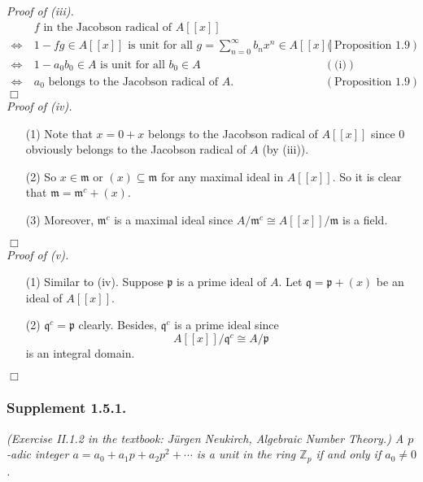 \documentclass{article}
\begin{document}
\emph{Proof of (iii).}
  \begin{align*}
    &\:
    \text{$f$ in the Jacobson radical of $A[[x]]$} \\
    \Longleftrightarrow &\:
    \text{$1-fg \in A[[x]]$ is unit for all $g = \sum_{n=0}^{\infty} b_n x^n \in A[[x]]$}
      &(\text{Proposition 1.9}) \\
    \Longleftrightarrow &\:
    \text{$1-a_0b_0 \in A$ is unit for all $b_0 \in A$}
      &(\text{(i)}) \\
    \Longleftrightarrow &\:
    \text{$a_0$ belongs to the Jacobson radical of $A$}.
      &(\text{Proposition 1.9})
  \end{align*}
$\Box$ \\



\emph{Proof of (iv).}
\begin{enumerate}
\item[(1)]
  Note that $x = 0 + x$ belongs to the Jacobson radical of $A[[x]]$ since
  $0$ obviously belongs to the Jacobson radical of $A$ (by (iii)).

\item[(2)]
  So $x \in \mathfrak{m}$ or $(x) \subseteq \mathfrak{m}$ for any maximal ideal in $A[[x]]$.
  So it is clear that $\mathfrak{m} = \mathfrak{m}^c + (x)$.

\item[(3)]
  Moreover, $\mathfrak{m}^c$ is a maximal ideal since
  $A/\mathfrak{m}^c \cong A[[x]]/\mathfrak{m}$ is a field.
\end{enumerate}
$\Box$ \\



\emph{Proof of (v).}
\begin{enumerate}
\item[(1)]
  Similar to (iv).
  Suppose $\mathfrak{p}$ is a prime ideal of $A$.
  Let $\mathfrak{q} = \mathfrak{p} + (x)$ be an ideal of $A[[x]]$.

\item[(2)]
  $\mathfrak{q}^c = \mathfrak{p}$ clearly.
  Besides, $\mathfrak{q}^c$ is a prime ideal since
  \[
    A[[x]]/\mathfrak{q}^c \cong A/\mathfrak{p}
  \]
  is an integral domain.
\end{enumerate}
$\Box$ \\



\subsubsection*{Supplement 1.5.1.}
\emph{(Exercise II.1.2 in the textbook: Jürgen Neukirch, Algebraic Number Theory.)
A $p$-adic integer $a = a_0 + a_1 p + a_2 p^2 + \cdots$
is a unit in the ring $\mathbb{Z}_p$ if and only if $a_0 \neq 0$.} \\
\end{document}
